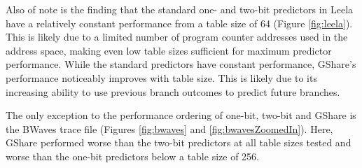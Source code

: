 \clearpage

Also of note is the finding that the standard one- and two-bit predictors in Leela have a relatively constant performance from a table size of 64 (Figure \ref{fig:leela}). This is likely due to a limited number of program counter addresses used in the address space, making even low table sizes sufficient for maximum predictor performance. While the standard predictors have constant performance, GShare's performance noticeably improves with table size. This is likely due to its increasing ability to use previous branch outcomes to predict future branches.

The only exception to the performance ordering of one-bit, two-bit and GShare is the BWaves trace file (Figures \ref{fig:bwaves} and \ref{fig:bwavesZoomedIn}). Here, GShare performed worse than the two-bit predictors at all table sizes tested and worse than the one-bit predictors below a table size of 256.

